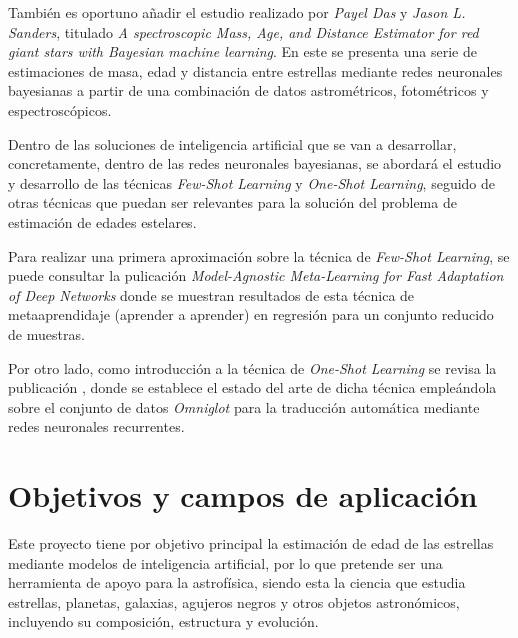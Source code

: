 \documentclass[12pt,oneside,a4paper]{article}
\begin{document}
También es oportuno añadir el estudio realizado por \textit{Payel Das} y \textit{Jason L. Sanders}, titulado \textit{A spectroscopic Mass, Age, and Distance Estimator for red
giant stars with Bayesian machine learning}. En este se presenta una serie de estimaciones de masa, edad y distancia entre estrellas mediante redes neuronales bayesianas a partir de una combinación de datos astrométricos, fotométricos y espectroscópicos. \cite{Das2018}

Dentro de las soluciones de inteligencia artificial que se van a desarrollar, concretamente, dentro de las redes neuronales bayesianas, se abordará el estudio y desarrollo de las técnicas \textit{Few-Shot Learning} y \textit{One-Shot Learning}, seguido de otras técnicas que puedan ser relevantes para la solución del problema de estimación de edades estelares.

Para realizar una primera aproximación sobre la técnica de \textit{Few-Shot Learning}, se puede consultar la pulicación \textit{Model-Agnostic Meta-Learning for Fast Adaptation of Deep Networks} donde se muestran resultados de esta técnica de metaaprendidaje (aprender a aprender) en regresión para un conjunto reducido de muestras. \cite{Chelsea2017}

Por otro lado, como introducción a la técnica de \textit{One-Shot Learning} se revisa la publicación , donde se establece el estado del arte de dicha técnica empleándola sobre el conjunto de datos \textit{Omniglot} para la traducción automática mediante redes neuronales recurrentes. \cite{Kaiser2017}


\section{Objetivos y campos de aplicación}
Este proyecto tiene por objetivo principal la estimación de edad de las estrellas mediante modelos de inteligencia artificial, por lo que pretende ser una herramienta de apoyo para la astrofísica, siendo esta la ciencia que estudia estrellas, planetas, galaxias, agujeros negros y otros objetos astronómicos, incluyendo su composición, estructura y evolución.
\end{document}
